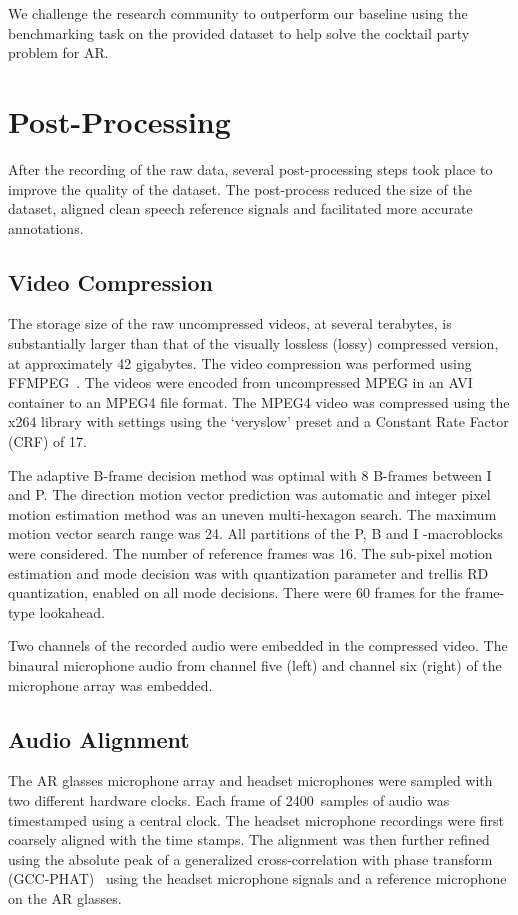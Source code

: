 \documentclass[journal]{IEEEtran}
\begin{document}
\begin{table*}[htb!]
\begin{center}
\begin{tabular}
{{We challenge the research community to outperform our baseline using the benchmarking task on the provided dataset to help solve the cocktail party problem for AR.


 

\appendices

\section{Post-Processing} \label{appx:PostProcessing}

After the recording of the raw data, several post-processing steps took place to improve the quality of the dataset.
The post-process reduced the size of the dataset, aligned clean speech reference signals and facilitated more accurate annotations.

\subsection{Video Compression} \label{sec:video_compression}
The storage size of the raw uncompressed videos, at several terabytes, is substantially larger than that of the visually lossless (lossy) compressed version, at approximately 42 gigabytes.
The video compression was performed using FFMPEG~\cite{}.
The videos were encoded from uncompressed MPEG in an AVI container to an MPEG4 file format.
The MPEG4 video was compressed using the x264 library with settings using the `veryslow' preset and a Constant Rate Factor (CRF) of 17.

The adaptive B-frame decision method was optimal with 8 B-frames between I and P.
The direction motion vector prediction was automatic and integer pixel motion estimation method was an uneven multi-hexagon search.
The maximum motion vector search range was 24.
All partitions of the P, B and I -macroblocks were considered.
The number of reference frames was 16.
The sub-pixel motion estimation and mode decision was with quantization parameter and trellis RD quantization, enabled on all mode decisions.
There were 60 frames for the frame-type lookahead.

Two channels of the recorded audio were embedded in the compressed video.
The binaural microphone audio from channel five (left) and channel six (right) of the microphone array was embedded.


\subsection{Audio Alignment} \label{sec:audio_alignment}
The AR glasses microphone array and headset microphones were sampled with two different hardware clocks.
Each frame of \SI{2400}{samples} of audio was timestamped using a central clock.
The headset microphone recordings were first coarsely aligned with the time stamps.
The alignment was then further refined using the absolute peak of a generalized cross-correlation with phase transform (GCC-PHAT)~\cite{1162830} using the headset microphone signals and a reference microphone on the AR glasses.


}}
\end{tabular}
\end{center}
\end{table*}
\end{document}
